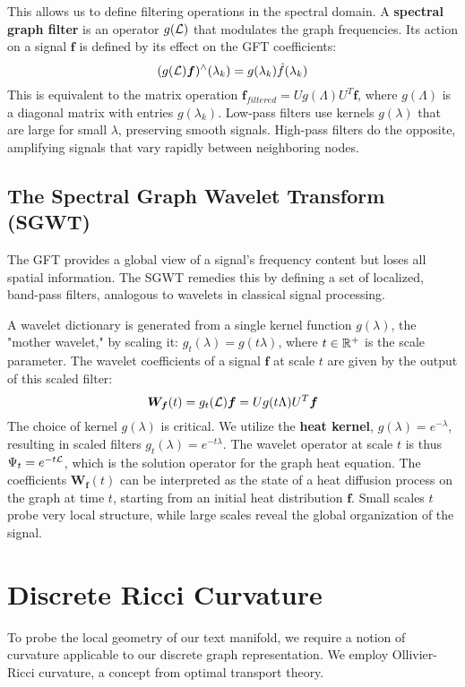 This allows us to define filtering operations in the spectral domain. A \textbf{spectral graph filter} is an operator $g(\mathcal{L})$ that modulates the graph frequencies. Its action on a signal $\bm{f}$ is defined by its effect on the GFT coefficients:
\begin{equation}
    (g(\mathcal{L})\bm{f})^{\wedge}(\lambda_k) = g(\lambda_k) \hat{f}(\lambda_k)
\end{equation}
This is equivalent to the matrix operation $\bm{f}_{filtered} = U g(\Lambda) U^T \bm{f}$, where $g(\Lambda)$ is a diagonal matrix with entries $g(\lambda_k)$. Low-pass filters use kernels $g(\lambda)$ that are large for small $\lambda$, preserving smooth signals. High-pass filters do the opposite, amplifying signals that vary rapidly between neighboring nodes.

\subsection{The Spectral Graph Wavelet Transform (SGWT)}
The GFT provides a global view of a signal's frequency content but loses all spatial information. The SGWT \citep{hammond2011wavelets} remedies this by defining a set of localized, band-pass filters, analogous to wavelets in classical signal processing.

A wavelet dictionary is generated from a single kernel function $g(\lambda)$, the "mother wavelet," by scaling it: $g_t(\lambda) = g(t\lambda)$, where $t \in \mathbb{R}^+$ is the scale parameter. The wavelet coefficients of a signal $\bm{f}$ at scale $t$ are given by the output of this scaled filter:
\begin{equation}
    \bm{W_f}(t) = g_t(\mathcal{L})\bm{f} = U g(t\Lambda) U^T \bm{f}
\end{equation}
The choice of kernel $g(\lambda)$ is critical. We utilize the \textbf{heat kernel}, $g(\lambda) = e^{-\lambda}$, resulting in scaled filters $g_t(\lambda) = e^{-t\lambda}$. The wavelet operator at scale $t$ is thus $\Psi_t = e^{-t\mathcal{L}}$, which is the solution operator for the graph heat equation. The coefficients $\bm{W_f}(t)$ can be interpreted as the state of a heat diffusion process on the graph at time $t$, starting from an initial heat distribution $\bm{f}$. Small scales $t$ probe very local structure, while large scales reveal the global organization of the signal.

\section{Discrete Ricci Curvature}
To probe the local geometry of our text manifold, we require a notion of curvature applicable to our discrete graph representation. We employ Ollivier-Ricci curvature, a concept from optimal transport theory.

